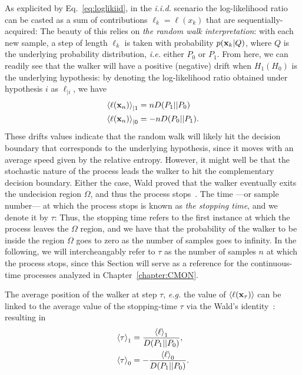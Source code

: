 As explicited by Eq.~\ref{eq:loglikiid}, in the \textit{i.i.d.} scenario the log-likelihood ratio can be casted as a sum of contributions $\ell_k = \ell(x_k)$ that are sequentially-acquired:
The beauty of this relies on \textit{the random walk interpretation}: with each new sample, a step of length $\ell_k$ is taken with probability $p(\mathbf{x}_k|Q)$, where $Q$ is the underlying probability distribution, \textit{i.e.} either $P_0$ or $P_1$. From here, we can readily see that the walker will have a positive (negative) drift when $H_1(H_0)$ is the underlying hypothesis: by denoting the log-likelihood ratio obtained under hypothesis $i$ as $\ell_{|i}$, we have
\begin{align}
\mathinner{\langle \ell(\mathbf{x}_n)\rangle}_{|1} &= n D(P_1||P_0) \\ \nonumber
\mathinner{\langle \ell(\mathbf{x}_n)\rangle}_{|0} &= -n D(P_0||P_1).
\end{align}
These drifts values indicate that the random walk will likely hit the decision boundary that corresponds to the underlying hypothesis, since it moves with an average speed given by the relative entropy. However, it might well be that the stochastic nature of the process leads the walker to hit the complementary decision boundary. Either the case, Wald proved that the walker eventually exits the undecision region $\Omega$, and thus the process stops~\cite{Wald1948Optimum}. The time ---or sample number--- at which the process stops is known as \textit{the stopping time}, and we denote it by $\tau$:
 Thus, the stopping time refers to the first instance at which the process leaves the $\Omega$ region, and we have that the probability of the walker to be inside the region $\Omega$ goes to zero as the number of samples goes to infinity. In the following, we will intercheangably refer to $\tau$ as the number of samples $n$ at which the process stops, since this Section will serve as a reference for the continuous-time processes analyzed in Chapter~\ref{chapter:CMON}.

The average position of the walker at step $\tau$, \textit{e.g.} the value of $\mathinner{\langle \ell(\mathbf{x}_\tau)\rangle}$ can be linked to the average value of the stopping-time $\tau$ via the Wald's identity~\cite{probcompbook}:
resulting in
\begin{align}\label{eq:waldsolved}
\mathinner{\langle \tau\rangle}_{1} &= \frac{\mathinner{\langle \ell\rangle}_{1}}{D(P_1||P_0)}, \\
\mathinner{\langle \tau\rangle}_{0} &= -\frac{\mathinner{\langle \ell\rangle}_{0}}{D(P_1||P_0)}.
\end{align}

